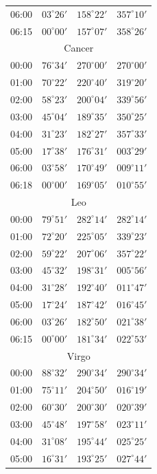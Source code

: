 \begin{table}[!h]
\begin{Parallel}{}{}
{{\begin{tabular}{l|lll}
06:00 & $03^\circ 26'$ & $158^\circ 22'$ & $357^\circ 10'$\\
06:15 & $00^\circ 00'$ & $157^\circ 07'$ & $358^\circ 26'$\\
\multicolumn{4}{c}{Cancer}\\
00:00 & $76^\circ 34'$ & $270^\circ 00'$ & $270^\circ 00'$\\
01:00 & $70^\circ 22'$ & $220^\circ 40'$ & $319^\circ 20'$\\
02:00 & $58^\circ 23'$ & $200^\circ 04'$ & $339^\circ 56'$\\
03:00 & $45^\circ 04'$ & $189^\circ 35'$ & $350^\circ 25'$\\
04:00 & $31^\circ 23'$ & $182^\circ 27'$ & $357^\circ 33'$\\
05:00 & $17^\circ 38'$ & $176^\circ 31'$ & $003^\circ 29'$\\
06:00 & $03^\circ 58'$ & $170^\circ 49'$ & $009^\circ 11'$\\
06:18 & $00^\circ 00'$ & $169^\circ 05'$ & $010^\circ 55'$\\
\multicolumn{4}{c}{Leo}\\
00:00 & $79^\circ 51'$ & $282^\circ 14'$ & $282^\circ 14'$\\
01:00 & $72^\circ 20'$ & $225^\circ 05'$ & $339^\circ 23'$\\
02:00 & $59^\circ 22'$ & $207^\circ 06'$ & $357^\circ 22'$\\
03:00 & $45^\circ 32'$ & $198^\circ 31'$ & $005^\circ 56'$\\
04:00 & $31^\circ 28'$ & $192^\circ 40'$ & $011^\circ 47'$\\
05:00 & $17^\circ 24'$ & $187^\circ 42'$ & $016^\circ 45'$\\
06:00 & $03^\circ 26'$ & $182^\circ 50'$ & $021^\circ 38'$\\
06:15 & $00^\circ 00'$ & $181^\circ 34'$ & $022^\circ 53'$\\
\multicolumn{4}{c}{Virgo}\\
00:00 & $88^\circ 32'$ & $290^\circ 34'$ & $290^\circ 34'$\\
01:00 & $75^\circ 11'$ & $204^\circ 50'$ & $016^\circ 19'$\\
02:00 & $60^\circ 30'$ & $200^\circ 30'$ & $020^\circ 39'$\\
03:00 & $45^\circ 48'$ & $197^\circ 58'$ & $023^\circ 11'$\\
04:00 & $31^\circ 08'$ & $195^\circ 44'$ & $025^\circ 25'$\\
05:00 & $16^\circ 31'$ & $193^\circ 25'$ & $027^\circ 44'$\\

\end{tabular}}}
\end{Parallel}
\end{table}
